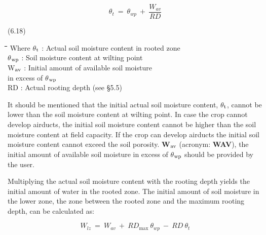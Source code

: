 \documentclass[11pt]{article}
\begin{document}
\begin{displaymath}
\theta  _{t} ~ =~\theta  _{wp} ~+~{\frac{W _{av} }{RD}}
\end{displaymath}

 \bigskip
\strut\hfill (6.18)

\nwln
\begin{tabbing}
\hspace{1.27cm}\=\hspace{1.27cm}\=\hspace{1.27cm}\=\hspace{1.27cm}\=%
\hspace{1.27cm}\=\hspace{1.27cm}\=\hspace{1.27cm}\=\hspace{1.27cm}\=%
\hspace{1.27cm}\=\hspace{1.27cm}\=\kill
Where\> \> $\theta$$_{{\rm t}}$\> : Actual soil moisture content in rooted zone \> \> \> \> \> \> \> [cm$^{{\rm 3}}$ cm$^{{\rm -3}}$]\\
\>\> $\theta$$_{{\rm wp}}$\> : Soil moisture content at wilting point \> \> \> \> \> \> \> [cm$^{{\rm 3}}$ cm$^{{\rm -3}}$]\\
\>\> W$_{{\rm av}}$\> : Initial amount of available soil moisture\\
\>\> \>   in excess of $\theta$$_{{\rm wp}}$\> \> \> \> \> \> \> [cm]\\
\>\> RD\> : Actual rooting depth (see \S 5.5)\> \> \> \> \> \> \> [cm]
\end{tabbing}

\bigskip
\bigskip
It should be mentioned that the initial actual soil moisture content, $\theta$$_{{\rm t}}$, cannot be lower
than the soil moisture content at wilting point. In case the crop cannot develop airducts,
the initial soil moisture content cannot be higher than the soil moisture content at field
capacity. If the crop can develop airducts the initial soil moisture content cannot exceed
the soil porosity. {\bf W$_{{\rm av}}$} (acronym: {\bf WAV}), the initial amount of available soil moisture in
excess of $\theta$$_{{\rm wp}}$ should be provided by the user. 

\bigskip
\bigskip
Multiplying the actual soil moisture content with the rooting depth yields the initial
amount of water in the rooted zone. The initial amount of soil moisture in the lower zone,
the zone between the rooted zone and the maximum rooting depth, can be calculated as:

\begin{displaymath}
W  _{lz} ~ =~ W _{av} ~+~ RD _{\max } ~\theta _{wp} ~-~RD~\theta _{t} 
\end{displaymath}
\end{document}
